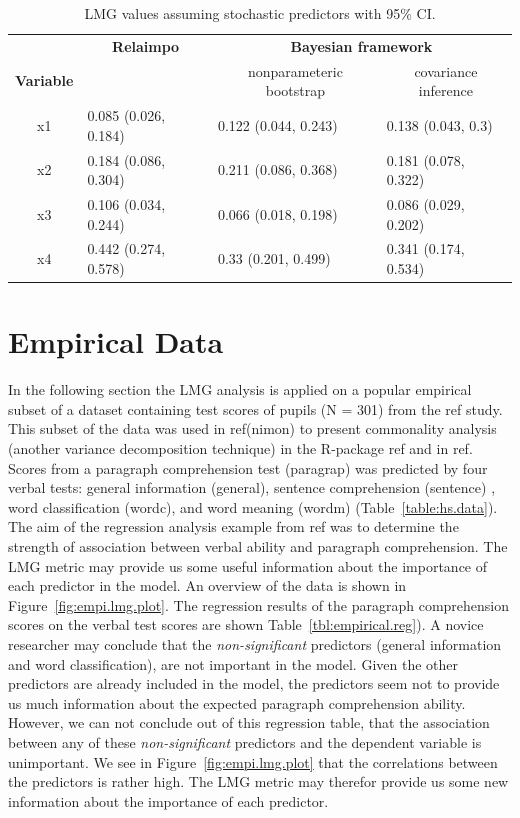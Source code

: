\documentclass[11pt,a4paper,twoside]{book}\usepackage[]{graphicx}\usepackage[]{color}
\begin{document}
\begin{table}[h]
\caption{LMG values assuming stochastic predictors with 95\% CI.}
\centering
\begin{tabular}{clll}
   \toprule
  & \multicolumn{1}{c}{\textbf{Relaimpo}} & \multicolumn{2}{c}{\textbf{Bayesian framework}} \\ \cmidrule(r){2-2}\cmidrule(l){3-4}
 \textbf{Variable} &  & \multicolumn{1}{c}{nonparameteric bootstrap}& \multicolumn{1}{c}{covariance inference} \\
 \midrule
x1 & 0.085 (0.026, 0.184)  & 0.122 (0.044, 0.243) &  0.138 (0.043, 0.3) \\ 
x2 & 0.184 (0.086, 0.304)  & 0.211 (0.086, 0.368)  & 0.181 (0.078, 0.322) \\ 
x3 & 0.106 (0.034, 0.244)  & 0.066 (0.018, 0.198)  & 0.086 (0.029, 0.202) \\ 
x4 & 0.442 (0.274, 0.578) & 0.33 (0.201, 0.499) & 0.341 (0.174, 0.534) \\ 
   \bottomrule
\end{tabular}
\label{tbl:nonstochEx1relaimpstoch}
\end{table}







\clearpage

\section{Empirical Data}
In the following section the LMG analysis is applied on a popular empirical subset of a dataset containing test scores of pupils (N = 301) from the ref study. This subset of the data was used in ref(nimon) to present commonality analysis (another variance decomposition technique) in the R-package ref and in ref. Scores from a paragraph comprehension test (paragrap) was predicted by four verbal tests:  general information (general),  sentence comprehension (sentence) ,  word classification (wordc), and  word meaning (wordm) (Table~\ref{table:hs.data}). The aim of the regression analysis example from ref was to determine the strength of association between verbal ability and paragraph comprehension. The LMG metric may provide us some useful information about the importance of each predictor in the model. 
An overview of the data is shown in Figure~\ref{fig:empi.lmg.plot}. The regression results of the paragraph comprehension scores on the verbal test scores are shown Table~\ref{tbl:empirical.reg}). A novice researcher may conclude that the \textit{non-significant} predictors (general information and word classification), are not important in the model. Given the other predictors are already included in the model, the predictors seem not to provide us much information about the expected paragraph comprehension ability. However, we can not conclude out of this regression table, that the association between any of these \textit{non-significant} predictors and the dependent variable is unimportant. We see in Figure~\ref{fig:empi.lmg.plot} that the correlations between the predictors is rather high. The LMG metric may therefor provide us some new information about the importance of each predictor. 
\end{document}
